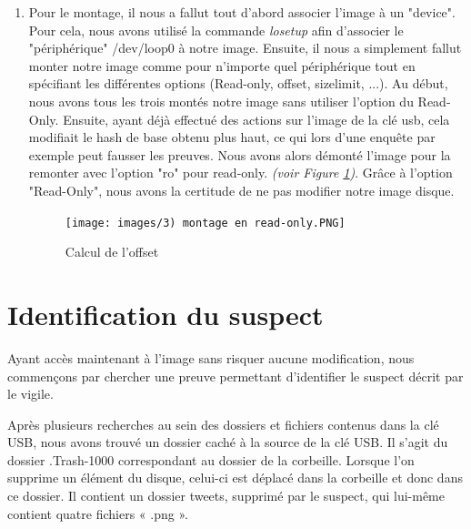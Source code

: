 \documentclass[a4paper]{article}
\begin{document}
\begin{enumerate}
    \item Pour le montage, il nous a fallut tout d'abord associer l'image à un "device". Pour cela, nous avons utilisé la commande \emph{losetup} afin d'associer le "périphérique" /dev/loop0 à notre image. Ensuite, il nous a simplement fallut monter notre image comme pour n'importe quel périphérique tout en spécifiant les différentes options (Read-only, offset, sizelimit, ...). Au début, nous avons tous les trois montés notre image sans utiliser l'option du Read-Only. Ensuite, ayant déjà effectué des actions sur l'image de la clé usb, cela modifiait le hash de base obtenu plus haut, ce qui lors d'une enquête par exemple peut fausser les preuves. Nous avons alors démonté l'image pour la remonter avec l'option "ro" pour read-only.  \emph{(voir Figure \ref{mount})}. Grâce à l'option "Read-Only", nous avons la certitude de ne pas modifier notre image disque.

\begin{figure}[H]
    \centering
    \texttt{[image: images/3) montage en read-only.PNG]}
    \caption{Calcul de l'offset}
    \label{mount}
\end{figure}
    
\end{enumerate}


















\section{Identification du suspect}

Ayant accès maintenant à l’image sans risquer aucune modification, nous commençons par chercher une preuve permettant d’identifier le suspect décrit par le vigile.

Après plusieurs recherches au sein des dossiers et fichiers contenus dans la clé USB, nous avons trouvé un dossier caché à la source de la clé USB. Il s’agit du dossier .Trash-1000 correspondant au dossier de la corbeille. Lorsque l’on supprime un élément du disque, celui-ci est déplacé dans la corbeille et donc dans ce dossier. Il contient un dossier tweets, supprimé par le suspect, qui lui-même contient quatre fichiers « .png ».
\end{document}
